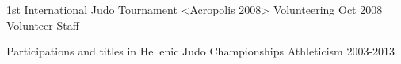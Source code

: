 



\begin{cventries}



\cventry
{1st International Judo Tournament <Acropolis 2008>} %
{Volunteering} %
{} %
{Oct 2008} %
{Volunteer Staff} %





\cventry
{Participations and titles in Hellenic Judo Championships} %
{Athleticism} %
{} %
{2003-2013} %
{}





\end{cventries}
